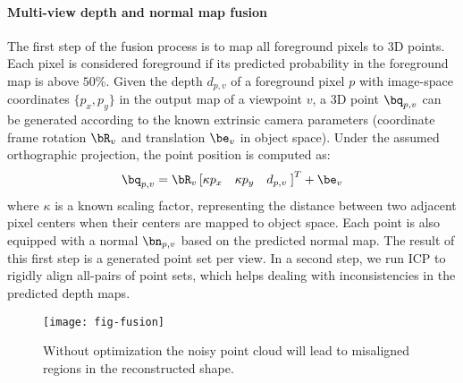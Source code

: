 \documentclass[10pt, conference, compsocconf]{IEEEtran}
\begin{document}
\vspace{-1mm}\paragraph{Multi-view depth and normal map fusion} The  first step of the fusion process is to map all foreground pixels to 3D points.  Each pixel is  considered foreground if its predicted probability in the foreground map is above $50\%$. Given the depth $d_{p,v}$ of a foreground pixel $p$ with image-space coordinates $\{p_x, p_y\}$ in the output map of a viewpoint $v$, a 3D point $\bq_{p,v}$ can be generated according to the known extrinsic camera parameters (coordinate frame rotation $\bR_{v }$ and translation $\be_v$ in object space). Under the assumed orthographic projection, the point position is computed as:
\vspace{-1mm}\begin{equation}
\bq_{p,v} = \bR_{v} \left[ \kappa p_x \quad \kappa p_y \quad d_{p,v} \; \right]^T + \be_v \nonumber
\end{equation}\vskip -3mm
where $\kappa$ is a known scaling factor, representing the distance between two adjacent pixel centers when their centers are mapped to object space. Each point is also equipped with a normal $\bn_{p,v}$ based on the predicted normal map. The result of this first step is a generated point set per view. In a second step, we run ICP \cite{icp} to  rigidly align all-pairs of  point sets, which helps dealing with inconsistencies in the predicted depth maps.    
 

\begin{figure}[t!]
\centering
\texttt{[image: fig-fusion]}
\vspace{-7mm}
\caption{ Without optimization the noisy point cloud will lead to misaligned regions in the reconstructed shape. }
\label{fig:fusion}
\vspace{-6mm}
\end{figure}
\end{document}
